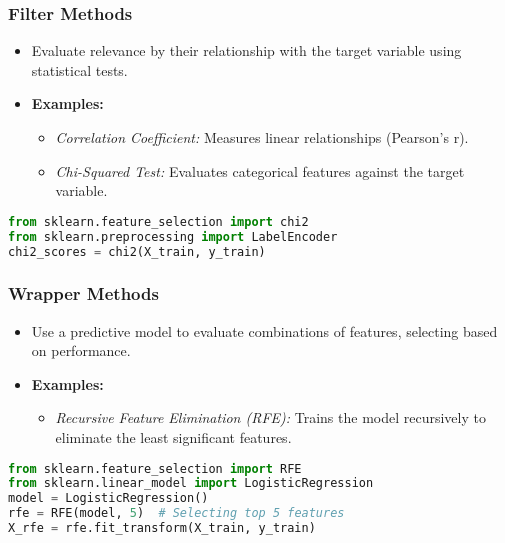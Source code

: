 \documentclass[aspectratio=169]{beamer}
\begin{document}
\begin{frame}[fragile]
    \frametitle{Filter Methods}
    \begin{itemize}
        \item Evaluate relevance by their relationship with the target variable using statistical tests.
        \item \textbf{Examples:}
        \begin{itemize}
            \item \textit{Correlation Coefficient:} Measures linear relationships (Pearson’s r).
            \item \textit{Chi-Squared Test:} Evaluates categorical features against the target variable.
        \end{itemize}
    \end{itemize}
    \begin{lstlisting}[language=Python]
from sklearn.feature_selection import chi2
from sklearn.preprocessing import LabelEncoder
chi2_scores = chi2(X_train, y_train)
    \end{lstlisting}
\end{frame}

\begin{frame}[fragile]
    \frametitle{Wrapper Methods}
    \begin{itemize}
        \item Use a predictive model to evaluate combinations of features, selecting based on performance.
        \item \textbf{Examples:}
        \begin{itemize}
            \item \textit{Recursive Feature Elimination (RFE):} Trains the model recursively to eliminate the least significant features.
        \end{itemize}
    \end{itemize}
    \begin{lstlisting}[language=Python]
from sklearn.feature_selection import RFE
from sklearn.linear_model import LogisticRegression
model = LogisticRegression()
rfe = RFE(model, 5)  # Selecting top 5 features
X_rfe = rfe.fit_transform(X_train, y_train)
    \end{lstlisting}
\end{frame}
\end{document}
